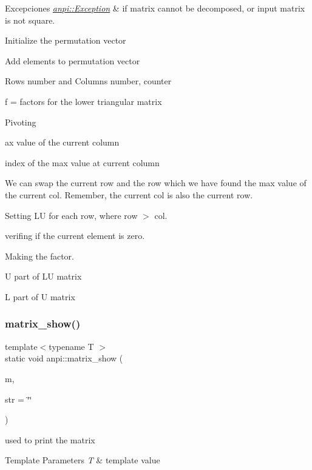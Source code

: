 \begin{DoxyExceptions}{Excepciones}
{\em \hyperlink{classanpi_1_1Exception}{anpi\+::\+Exception}} & if matrix cannot be decomposed, or input matrix is not square. \\
\hline
\end{DoxyExceptions}
Initialize the permutation vector

Add elements to permutation vector

Rows number and Columns number, counter

f = factors for the lower triangular matrix

Pivoting

ax value of the current column

index of the max value at current column

We can swap the current row and the row which we have found the max value of the current col. Remember, the current col is also the current row.

Setting LU for each row, where row $>$ col.

verifing if the current element is zero.

Making the factor.

U part of LU matrix

L part of U matrix \mbox{\label{namespaceanpi_afa95d4a99d0176f086ca7babb01c4e55}} 
\subsubsection{\texorpdfstring{matrix\+\_\+show()}{matrix\_show()}}
{\footnotesize\ttfamily template$<$typename T $>$ \\
static void anpi\+::matrix\+\_\+show (\begin{DoxyParamCaption}\item[{const \hyperlink{classanpi_1_1Matrix}{Matrix}$<$ T $>$ \&}]{m,  }\item[{const std\+::string \&}]{str = {\ttfamily \char`\"{}\char`\"{}} }\end{DoxyParamCaption})\hspace{0.3cm}{\ttfamily [static]}}



used to print the matrix 


\begin{DoxyTemplParams}{Template Parameters}
{\em T} & template value \\
\hline
\end{DoxyTemplParams}

